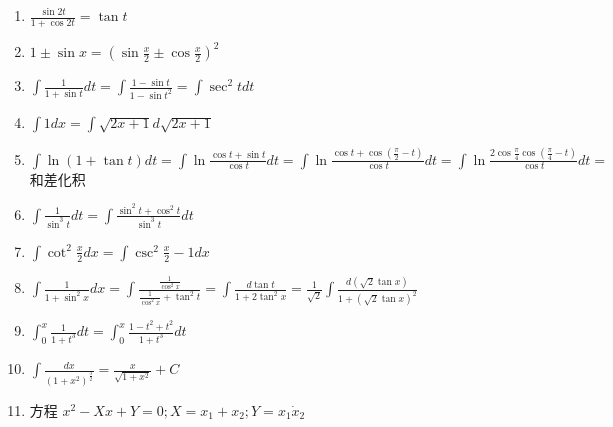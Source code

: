 \documentclass[UTF8]{ctexart}
\begin{document}
\begin{enumerate}
  \item $\frac{\sin 2t }{1+ \cos 2t}=\tan t$ \\
  \item $1 \pm \sin x ={(\sin \frac{x}{2} \pm \cos \frac{x}{2})}^2$ \\
  \item $\int \frac{1}{1+ \sin t }dt = \int \frac{1-\sin t}{1-{\sin t}^2}=\int \sec^2 tdt$ \\
  \item $\int 1 dx =\int \sqrt{2x+1} d \sqrt{2x+1}$ \\
  \item $\int \ln{(1+ \tan t)} dt = \int \ln \frac{\cos t +\sin t}{\cos t}dt=
  \int \ln \frac{\cos t + \cos (\frac{\pi}{2} -t ) }{\cos t} dt =
  \int \ln \frac{2 \cos \frac{\pi}{4} \cos (\frac{\pi}{4} -t)}{\cos t}dt =
$和差化积 \\
  \item $\int \frac{1}{\sin^3 t}dt =
\int \frac{\sin^2 t + \cos^2 t}{\sin^3 t }dt$
  \item $\int \cot^2 \frac{x}{2} dx= \int \csc^2 \frac{x}{2} -1 dx $
  \item $ \int \frac{1}{1+\sin^2 x} dx =\int \frac{\frac{1}{\cos^2 x}}{\frac {1}{\cos^2 x } + \tan^2 t}
  = \int \frac {d \tan t}{1+ 2\tan^2 x}
  = \frac{1}{\sqrt{2}} \int \frac{d ( \sqrt {2} \tan x)}{1+ {(\sqrt{2} \tan x)}^2}$
  \item $\int_0^x\frac{1}{1+t^3}dt=\int_0^x\frac{1-t^2+t^2}{1+t^3}dt$
  \item $\int \frac{dx}{{(1+x^2)}^\frac{3}{2}}=\frac{x}{\sqrt{1+x^2}} +C $ \\
  \item 方程 $x^2 -Xx+Y=0 ;X=x_1+x_2 ; Y=x_1 \dot x_2 $


\end{enumerate}
\end{document}
